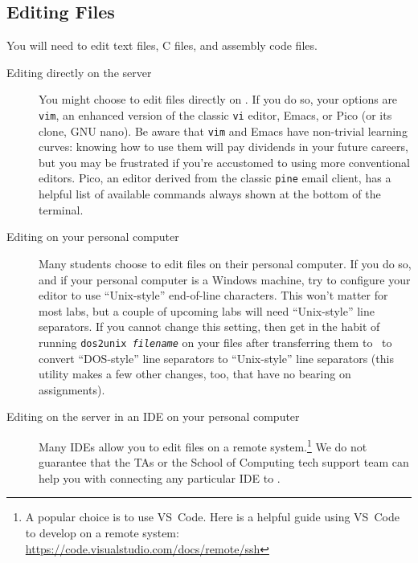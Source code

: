 \subsection{Editing Files}

You will need to edit text files, C files, and assembly code files.

\begin{description}
    \item[Editing directly on the server] You might choose to edit files directly on \runtimeenvironment.
        If you do so, your options are \texttt{vim}, an enhanced version of the classic \texttt{vi} editor, Emacs, or Pico (or its clone, GNU nano).
        Be aware that \texttt{vim} and Emacs have non-trivial learning curves: knowing how to use them will pay dividends in your future careers, but you may be frustrated if you're accustomed to using more conventional editors.
        Pico, an editor derived from the classic \texttt{pine} email client, has a helpful list of available commands always shown at the bottom of the terminal.
    \item[Editing on your personal computer] Many students choose to edit files on their personal computer.
        If you do so, and if your personal computer is a Windows machine, try to configure your editor to use ``Unix-style'' end-of-line characters.
        This won't matter for most labs, but a couple of upcoming labs will need ``Unix-style'' line separators.
        If you cannot change this setting, then get in the habit of running \texttt{dos2unix \textit{filename}} on your files after transferring them to \runtimeenvironment\ to convert ``DOS-style'' line separators to ``Unix-style'' line separators (this utility makes a few other changes, too, that have no bearing on \coursenumber assignments).
    \item[Editing on the server in an IDE on your personal computer] Many IDEs allow you to edit files on a remote system.\footnote{
            A popular choice is to use VS~Code. Here is a helpful guide using VS~Code to develop on a remote system: \url{https://code.visualstudio.com/docs/remote/ssh}
        }
        We do not guarantee that the TAs or the School of Computing tech support team can help you with connecting any particular IDE to \runtimeenvironment.
\end{description}



